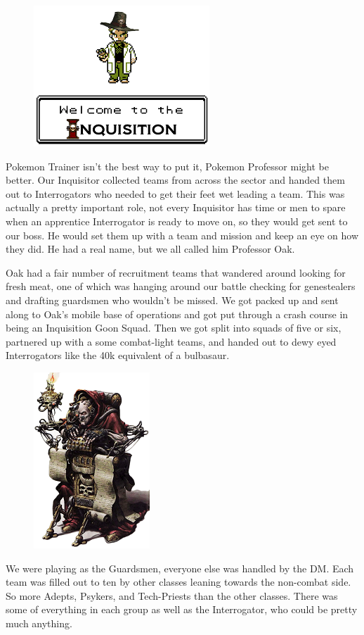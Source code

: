 \begin{figure}
	\begin{center}
		\includegraphics[width=\figwidth]{pics/2/2.png}
	\end{center}
\end{figure}
Pokemon Trainer isn't the best way to put it, Pokemon Professor might be better.
Our Inquisitor collected teams from across the sector and handed them out to Interrogators who needed to get their feet wet leading a team. 
This was actually a pretty important role, not every Inquisitor has time or men to spare when an apprentice Interrogator is ready to move on, so they would get sent to our boss. 
He would set them up with a team and mission and keep an eye on how they did. 
He had a real name, but we all called him Professor Oak.

Oak had a fair number of recruitment teams that wandered around looking for fresh meat, one of which was hanging around our battle checking for genestealers and drafting guardsmen who wouldn't be missed. 
We got packed up and sent along to Oak's mobile base of operations and got put through a crash course in being an Inquisition Goon Squad.
Then we got split into squads of five or six, partnered up with a some combat-light teams, and handed out to dewy eyed Interrogators like the 40k equivalent of a bulbasaur.


\begin{figure}
	\begin{center}
		\includegraphics[width=\figwidth]{pics/2/3.png}
	\end{center}
\end{figure}
We were playing as the Guardsmen, everyone else was handled by the DM. 
Each team  was filled out to ten by other classes leaning towards the non-combat side. 
So more Adepts, Psykers, and Tech-Priests than the other classes.
There was some of everything in each group as well as the Interrogator, who could be pretty much anything. 

